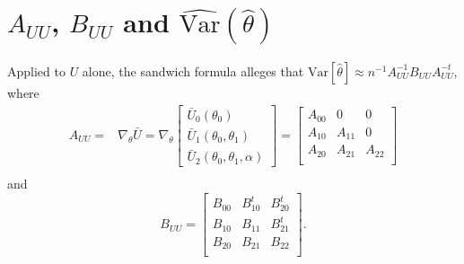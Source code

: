 \documentclass[12pt]{article}
\newcommand{\var}{\mathrm{Var}}
\begin{document}
\section*{$A_{UU}$, $B_{UU}$ and $\widehat{\var}(\hat\theta)$}
Applied to $U$ alone, the sandwich formula
\citep{stefanski2002calculus} alleges that $\var [ \hat\theta]  \approx
n^{-1}  A_{UU}^{-1} B_{UU} A_{UU}^{-t}$, where 
\begin{align*}
  A_{UU} =& \nabla_{\theta} \bar{U} =
\nabla_{\theta} \left[
            \begin{array}{c}
              \bar{U}_{0}(\theta_{0}) \\
              \bar{U}_{1}(\theta_{0}, \theta_{1}) \\
               \bar{U}_{2}(\theta_{0}, \theta_{1}, \alpha )
            \end{array}
\right] =
\left[
      \begin{array}{ccc}
        A_{00} & 0 & 0\\ 
A_{10} & A_{11} & 0 \\ 
A_{20} & A_{21} & A_{22} \\
      \end{array}
\right]  \\
\end{align*}
and 
\begin{equation*}
 B_{UU} =   \left[ \begin{array}{ccc}
        B_{00} & B_{10}^{t} & B_{20}^{t} \\ 
B_{10} & B_{11} & B_{21}^{t} \\ 
B_{20} & B_{21} & B_{22} \\
      \end{array}
\right]   .
\end{equation*}
\end{document}
